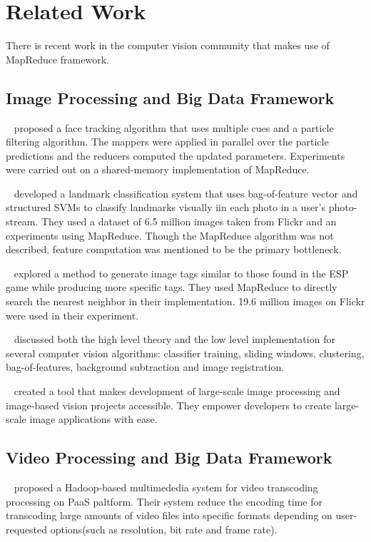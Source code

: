 \section{Related Work}
\label{sec:sec_background}

There is recent work in the computer vision community that makes use of
MapReduce framework. 

\subsection{Image Processing and Big Data Framework}
\citeauthor{2009_ICME_Liu}~\cite{2009_ICME_Liu} proposed a face tracking
algorithm that uses multiple cues and a particle filtering algorithm. The mappers were applied in parallel
over the particle predictions and the reducers computed the updated parameters.
Experiments were carried out on a shared-memory implementation of MapReduce. 

\citeauthor{2009_ICCV_Li}~\cite{2009_ICCV_Li} developed a landmark
classification system that uses bag-of-feature vector and structured SVMs to classify landmarks visually iin
each photo in a user's photo-stream. They used a dataset of 6.5 million images
taken from Flickr and an experiments using MapReduce. Though the MapReduce
algorithm was not described, feature computation was mentioned to be the primary
bottleneck. 

\citeauthor{2009_WSMC_Kennedy}~\cite{2009_WSMC_Kennedy} explored a method to
generate image tags similar to those found in the ESP game while producing more specific tags. They used
MapReduce to directly search the nearest neighbor in their implementation. 19.6
million images on Flickr were used in their experiment. 

\citeauthor{2010_KDD_White}~\cite{2010_KDD_White} discussed both the high level
theory and the low level implementation for several computer vision algorithms:
classifier training, sliding windows, clustering, bag-of-features, background
subtraction and image registration. 

\citeauthor{2011_thesis_sweeney}~\cite{2011_thesis_sweeney} created a tool that
makes development of large-scale image processing and image-based vision projects
accessible. They empower developers to create large-scale image applications
with ease.

\subsection{Video Processing and Big Data Framework}
\citeauthor{2012_SMCCSE_Kim}~\cite{2012_SMCCSE_Kim} proposed a Hadoop-based
multimededia system for video transcoding processing on PaaS paltform. Their
system reduce the encoding time for transcoding large amounts of video files
into specific formats depending on user-requested options(such as resolution,
bit rate and frame rate). 

